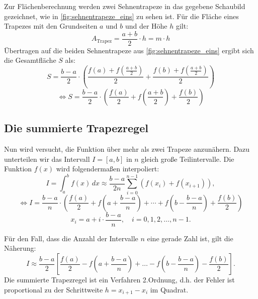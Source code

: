 Zur Flächenberechnung werden zwei Sehnentrapeze in das gegebene Schaubild gezeichnet, wie in \autoref{fig:sehnentrapeze_eins} zu sehen ist. Für die Fläche eines Trapezes mit den Grundseiten $a$ und $b$ und der Höhe $h$ gilt:
\[
A_{\text{Trapez}} = \frac{a + b}{2} \cdot h = m \cdot h
\]
Übertragen auf die beiden Sehnentrapeze aus \autoref{fig:sehnentrapeze_eins} ergibt sich die Gesamtfläche $S$ als:
\[
S = \frac{b - a}{2} \cdot \left( \frac{f(a) + f\left( \frac{a + b}{2} \right)}{2} + \frac{f(b) + f\left( \frac{a + b}{2} \right)}{2} \right)
\]
\[
  \Leftrightarrow S = \frac{b - a}{2} \cdot \left(\frac{f(a)}{2} + f\left(\frac{a + b}{2}\right) + \frac{f(b)}{2}\right)
\]

\subsection*{Die summierte Trapezregel}
Nun wird versucht, die Funktion über mehr als zwei Trapeze anzunähern. Dazu unterteilen wir das Intervall $I = [a, b]$ in $n$ gleich große Teilintervalle. Die Funktion \( f(x) \) wird folgendermaßen interpoliert:
\[
I = \int_a^b f(x) \, dx \approx \frac{b-a}{2n} \sum_{i=0}^{n-1} \left(f(x_i) + f(x_{i+1})\right),
\]
\[
  \Leftrightarrow I = \frac{b - a}{n} \cdot \left( \frac{f(a)}{2} + f \left( a + \frac{b - a}{n} \right) + \cdots + f \left( b - \frac{b - a}{n} \right) + \frac{f(b)}{2} \right)
\]
\[
x_i = a + i \cdot \frac{b-a}{n}, \quad i = 0, 1, 2, \ldots, n-1.
\]

Für den Fall, dass die Anzahl der Intervalle \( n \) eine gerade Zahl ist, gilt die Näherung:
\[
I \approx \frac{b-a}{2} \left[ \frac{f(a)}{2} - f \left(a + \frac{b-a}{n}\right) + \ldots - f \left(b - \frac{b-a}{n}\right) - \frac{f(b)}{2} \right].
\]
Die summierte Trapezregel ist ein Verfahren 2.Ordnung, d.h. der Fehler ist proportional zu der Schrittweite $h = x_{i+1} - x_i$ im Quadrat. \cite{vollskript}


